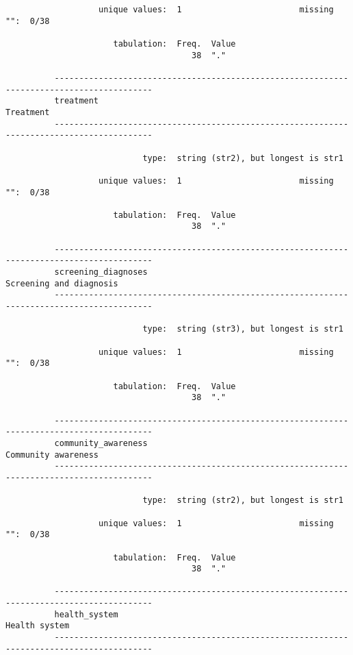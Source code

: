 \documentclass{article}
\begin{document}
\begin{verbatim}
                   unique values:  1                        missing "":  0/38
          
                      tabulation:  Freq.  Value
                                      38  "."
          
          ------------------------------------------------------------------------------------------
          treatment                                                                        Treatment
          ------------------------------------------------------------------------------------------
          
                            type:  string (str2), but longest is str1
          
                   unique values:  1                        missing "":  0/38
          
                      tabulation:  Freq.  Value
                                      38  "."
          
          ------------------------------------------------------------------------------------------
          screening_diagnoses                                                Screening and diagnosis
          ------------------------------------------------------------------------------------------
          
                            type:  string (str3), but longest is str1
          
                   unique values:  1                        missing "":  0/38
          
                      tabulation:  Freq.  Value
                                      38  "."
          
          ------------------------------------------------------------------------------------------
          community_awareness                                                    Community awareness
          ------------------------------------------------------------------------------------------
          
                            type:  string (str2), but longest is str1
          
                   unique values:  1                        missing "":  0/38
          
                      tabulation:  Freq.  Value
                                      38  "."
          
          ------------------------------------------------------------------------------------------
          health_system                                                                Health system
          ------------------------------------------------------------------------------------------
          

\end{verbatim}
\end{document}
